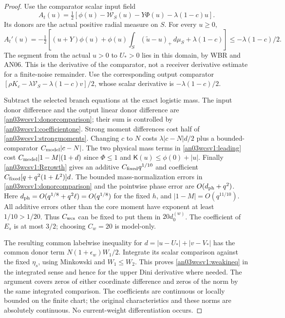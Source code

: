 \documentclass[11pt]{article}
\numberwithin{equation}{section}
\theoremstyle{remark}\newtheorem{remark}[theorem]{Remark}
\newcommand{\Kfun}{\mathsf K}\newcommand{\Ffun}{\mathsf F}
\newcommand{\ph}{\phi(0)}
\begin{document}
\begin{proof}
Use the comparator scalar input field
\[
 A_t(u)=\tfrac12[\phi(u)-\mathcal W_S(u)-Y\Phi(u)
                                      -\lambda(1-c)u].
\]
Its donors are the actual positive radial measure on $S$.
For every $u\ge0$,
\[
 A_t'(u)=-\tfrac12[(u+Y)\phi(u)
       +\phi(u)\int_S(\widetilde u-u)_+\,d\mu_S+\lambda(1-c)]
       \le-\lambda(1-c)/2.
\]
The segment from the actual $u>0$ to $U_*>0$ lies in this
domain, by WBR and AN06. This is the derivative of the comparator,
not a receiver derivative estimate for a finite-noise remainder.
Use the corresponding output comparator
$[\rho K_c-\lambda\mathcal V_S-\lambda(1-c)v]/2$,
whose scalar derivative is $-\lambda(1-c)/2$.

Subtract the selected branch equations at the exact logistic mass.
The input donor difference and the output linear donor difference
are \eqref{an03wcsv1:donorcomparison}; their sum is controlled by
\eqref{an03wcsv1:coefficientone}.
Strong moment differences cost half of
\eqref{an03wcsv1:strongmoments}.
Changing $c$ to $N$ costs
$\lambda|c-N|d/2$ plus a bounded-comparator
$C_{\rm model}|c-N|$.
The two physical mass terms in \eqref{an03wcsv1:leading} cost
$C_{\rm model}|1-M|(1+d)$ since $\Phi\le1$ and
$\Kfun(u)\le\ph+|u|$.
Finally \eqref{an03wcsv1:Rgrowth} gives an additive
$C_{\rm fixed}q^{1/10}$ and coefficient
$C_{\rm fixed}[q+q^2(1+L^2)]d$.
The bounded mass-normalization errors in
\eqref{an03wcsv1:donorcomparison} and the pointwise phase error
are $O(d_{\rm ph}+q^2)$.
Here $d_{\rm ph}=O(q^{1/8}+q^2\ell)=O(q^{1/8})$ for the fixed
$h$, and $|1-M|=O(q^{11/10})$.
All additive errors other than the core moment have exponent
at least $1/10>1/20$. Thus $C_{\rm wcs}$ can be fixed to put
them in $20d_0^{(w)}$. The coefficient of $E_s$ is at most
$3/2$; choosing $C_w=20$ is model-only.

The resulting common labelwise inequality for
$d=|u-U_*|+|v-V_*|$ has the common donor term
$N(1+\epsilon_w)W_1/2$. Integrate its scalar comparison against
the fixed $\eta_s$, using Minkowski and $W_1\le W_2$.
This proves \eqref{an03wcsv1:weakineq} in the integrated sense
and hence for the upper Dini derivative where needed.
The argument covers zeros of either coordinate difference and
zeros of the norm by the same integrated comparison.
The coefficients are continuous or locally bounded on the finite
chart; the original characteristics and these norms are absolutely
continuous. No current-weight differentiation occurs.


\end{proof}
\end{document}
